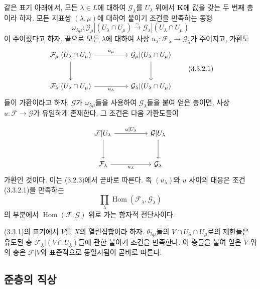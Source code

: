 \begin{env}[3.3.2]
\label{0.3.3.2-ko}
같은 표기 아래에서, 모든 $\lambda\in L$에 대하여 $\mathcal G_\lambda$를 $U_\lambda$ 위에서 $\mathbf K$에 값을 갖는 두 번째 층이라 하자. 모든 지표쌍 $(\lambda,\mu)$에 대하여 붙이기 조건을 만족하는 동형
\[
  \omega_{\lambda\mu}:
  \mathcal G_\mu|(U_\lambda\cap U_\mu)
  \xrightarrow{\sim}
  \mathcal G_\lambda|(U_\lambda\cap U_\mu)
\]
이 주어졌다고 하자. 끝으로 모든 $\lambda$에 대하여 사상 $u_\lambda:\mathcal F_\lambda\to\mathcal G_\lambda$가 주어지고, 가환도
\begin{equation}
\begin{tikzcd}[column sep=huge,row sep=large]
\mathcal F_\mu|(U_\lambda\cap U_\mu)
  \arrow[r,"u_\mu"] \arrow[d]
  & \mathcal G_\mu|(U_\lambda\cap U_\mu) \arrow[d] \\
\mathcal F_\lambda|(U_\lambda\cap U_\mu)
  \arrow[r,"u_\lambda"']
  & \mathcal G_\lambda|(U_\lambda\cap U_\mu)
\end{tikzcd}
\tag{3.3.2.1}\label{0.3.3.2.1-ko}
\end{equation}
들이 가환이라고 하자. $\mathcal G$가 $\omega_{\lambda\mu}$들을 사용하여 $\mathcal G_\lambda$들을 붙여 얻은 층이면, 사상 $u:\mathcal F\to\mathcal G$가 유일하게 존재한다. 그 조건은 다음 가환도들이


\[
\begin{tikzcd}[column sep=huge,row sep=large]
\mathcal F|U_\lambda
  \arrow[r,"u|U_\lambda"] \arrow[d]
  & \mathcal G|U_\lambda \arrow[d] \\
\mathcal F_\lambda
  \arrow[r,"u_\lambda"']
  & \mathcal G_\lambda
\end{tikzcd}
\]
가환인 것이다. 이는 (3.2.3)에서 곧바로 따른다. 족 $(u_\lambda)$와 $u$ 사이의 대응은 조건 (3.3.2.1)을 만족하는
\[
  \prod_\lambda
  \operatorname{Hom}(\mathcal F_\lambda,\mathcal G_\lambda)
\]
의 부분에서 $\operatorname{Hom}(\mathcal F,\mathcal G)$ 위로 가는 함자적 전단사이다.
\end{env}

\begin{env}[3.3.3]
\label{0.3.3.3-ko}
(3.3.1)의 표기에서 $V$를 $X$의 열린집합이라 하자. $\theta_{\lambda\mu}$들의 $V\cap U_\lambda\cap U_\mu$로의 제한들은 유도된 층 $\mathcal F_\lambda|(V\cap U_\lambda)$들에 관한 붙이기 조건을 만족한다. 이 층들을 붙여 얻은 $V$ 위의 층은 $\mathcal F|V$와 표준적으로 동일시됨이 곧바로 따른다.
\end{env}

\subsection{준층의 직상}
\label{subsection:0.3.4-ko}

